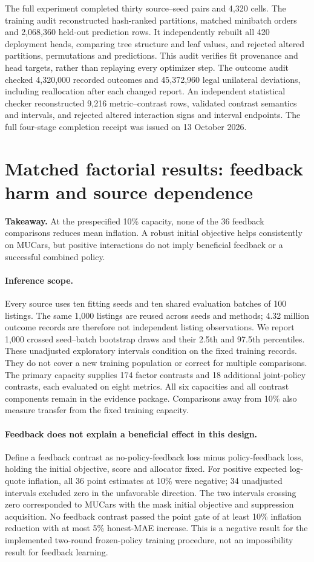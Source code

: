 \documentclass[11pt]{article}
\begin{document}
The full experiment completed thirty source--seed pairs and 4,320 cells.
The training audit reconstructed hash-ranked partitions, matched minibatch
orders and 2,068,360 held-out prediction rows. It independently rebuilt all
420 deployment heads, comparing tree structure and leaf values, and rejected
altered partitions, permutations and predictions. This audit verifies fit
provenance and head targets, rather than replaying every optimizer step.
The outcome audit checked 4,320,000 recorded outcomes and 45,372,960 legal
unilateral deviations, including reallocation after each changed report.
An independent statistical checker reconstructed 9,216 metric--contrast rows,
validated contrast semantics and intervals, and rejected altered interaction
signs and interval endpoints. The full four-stage completion receipt was
issued on 13 October 2026.

\section{Matched factorial results: feedback harm and source dependence}
\noindent\textbf{Takeaway.} At the prespecified 10\% capacity, none of the
36 feedback comparisons reduces mean inflation. A robust initial objective
helps consistently on MUCars, but positive interactions do not imply beneficial
feedback or a successful combined policy.

\paragraph{Inference scope.}
Every source uses ten fitting seeds and ten shared evaluation batches of
100 listings. The same 1,000 listings are reused across seeds and methods;
4.32 million outcome records are therefore not independent listing observations.
We report 1,000 crossed seed--batch bootstrap draws and their 2.5th and 97.5th
percentiles. These unadjusted exploratory intervals condition on the fixed
training records. They do not cover a new training population or correct for
multiple comparisons. The primary capacity supplies 174 factor contrasts and
18 additional joint-policy contrasts, each evaluated on eight metrics.
All six capacities and all contrast components remain in the evidence package.
Comparisons away from 10\% also measure transfer from the fixed training capacity.

\paragraph{Feedback does not explain a beneficial effect in this design.}
Define a feedback contrast as no-policy-feedback loss minus policy-feedback
loss, holding the initial objective, score and allocator fixed. For positive
expected log-quote inflation, all 36 point estimates at 10\% were negative;
34 unadjusted intervals excluded zero in the unfavorable direction.
The two intervals crossing zero corresponded to MUCars with the mask initial
objective and suppression acquisition. No feedback contrast passed the point
gate of at least 10\% inflation reduction with at most 5\% honest-MAE increase.
This is a negative result for the implemented two-round frozen-policy training
procedure, not an impossibility result for feedback learning.
\end{document}
